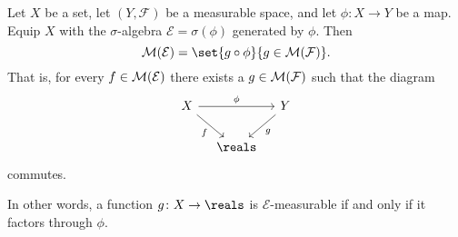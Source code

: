 \documentclass[article, a4paper, 11pt, oneside]{memoir}
\numberwithin{equation}{chapter}
\newcommand{\calE}{\mathcal{E}}
\newcommand{\calF}{\mathcal{F}}
\begin{document}
\begin{proposition}
    Let $X$ be a set, let $(Y,\calF)$ be a measurable space, and let $\phi \colon X \to Y$ be a map. Equip $X$ with the $\sigma$-algebra $\calE = \sigma(\phi)$ generated by $\phi$. Then
    \begin{equation}
        \label{eq:factorisation-lemma}
        \meas{\calE}
            = \set{g \circ \phi}{g \in \meas{\calF}}.
    \end{equation}
    That is, for every $f \in \meas{\calE}$ there exists a $g \in \meas{\calF}$ such that the diagram
    \begin{equation*}
        \begin{tikzcd}[column sep=1em]
            X
                \ar[rr, "\phi"]
                \ar[dr, "f", swap]
            && Y
                \ar[dl, "g"] \\
            & \reals
        \end{tikzcd}
    \end{equation*}
    commutes.
\end{proposition}
%
In other words, a function $g \colon X \to \reals$ is $\calE$-measurable if and only if it factors through $\phi$.
\end{document}

